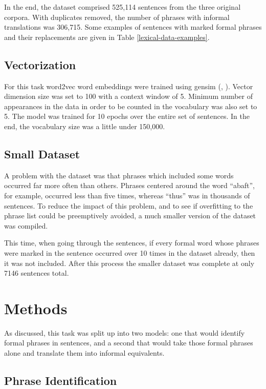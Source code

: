 In the end, the dataset comprised 525,114 sentences from the three original corpora. With duplicates removed, the number of phrases with informal translations was 306,715. Some examples of sentences with marked formal phrases and their replacements are given in Table \ref{lexical-data-examples}.

\subsection{Vectorization}

For this task word2vec word embeddings were trained using gensim (\cite{mikolov2013word2vec}, \cite{rehurek2010gensim}). Vector dimension size was set to 100 with a context window of 5. Minimum number of appearances in the data in order to be counted in the vocabulary was also set to 5. The model was trained for 10 epochs over the entire set of sentences. In the end, the vocabulary size was a little under 150,000.

\subsection{Small Dataset}

A problem with the dataset was that phrases which included some words occurred far more often than others. Phrases centered around the word ``abaft'', for example, occurred less than five times, whereas ``thus'' was in thousands of sentences. To reduce the impact of this problem, and to see if overfitting to the phrase list could be preemptively avoided, a much smaller version of the dataset was compiled.

This time, when going through the sentences, if every formal word whose phrases were marked in the sentence occurred over 10 times in the dataset already, then it was not included. After this process the smaller dataset was complete at only 7146 sentences total.

\section{Methods}

As discussed, this task was split up into two models: one that would identify formal phrases in sentences, and a second that would take those formal phrases alone and translate them into informal equivalents.

\subsection{Phrase Identification}

